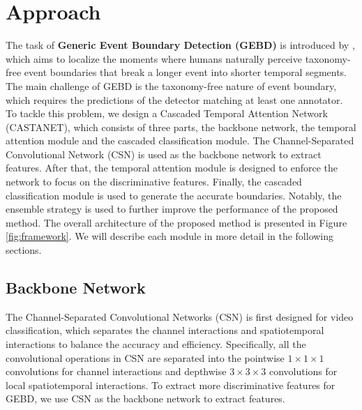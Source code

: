 \documentclass[final]{cvpr}
\begin{document}
\section{Approach}
The task of \textbf{Generic Event Boundary Detection (GEBD)} is introduced by \cite{DBLP:journals/corr/GEBD_dataset}, which aims to localize the moments where humans naturally perceive taxonomy-free event boundaries that break a longer event into shorter temporal segments. The main challenge of GEBD is the taxonomy-free nature of event boundary, which requires the predictions of the detector matching at least one annotator. To tackle this problem, we design a Cascaded Temporal Attention Network (CASTANET), which consists of three parts, the backbone network, the temporal attention module and the cascaded classification module. The Channel-Separated Convolutional Network (CSN) \cite{CSN} is used as the backbone network to extract features. After that, the temporal attention module is designed to enforce the network to focus on the discriminative features. Finally, the cascaded classification module is used to generate the accurate boundaries. Notably, the ensemble strategy is used to further improve the performance of the proposed method. The overall architecture of the proposed method is presented in Figure \ref{fig:framework}. We will describe each module in more detail in the following sections.  

\subsection{Backbone Network}
The Channel-Separated Convolutional Networks (CSN) \cite{CSN} is first designed for video classification, which separates the channel interactions and spatiotemporal interactions to balance the accuracy and efficiency. Specifically, all the convolutional operations in CSN are separated into the pointwise $1\times1\times1$ convolutions for channel interactions and depthwise $3\times3\times3$ convolutions for local spatiotemporal interactions. To extract more discriminative features for GEBD, we use CSN as the backbone network to extract features.
\end{document}
